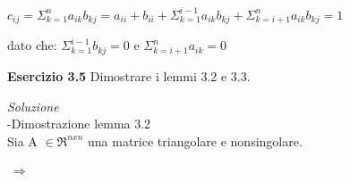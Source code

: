 \documentclass[20pt,a4paper]{book}
\begin{document}
\begin{math} c_{ij}=\Sigma_{k=1}^{n}a_{ik}b_{kj}=a_{ii}+b_{ii}+ \Sigma_{k=1}^{i-1}a_{ik}b_{kj}+ \Sigma_{k=i+1}^{n}a_{ik}b_{kj}=1 \end{math}

dato che: \begin{math} \Sigma_{k=1}^{i-1}b_{kj}=0\end{math} e   \begin{math}\Sigma_{k=i+1}^{n}a_{ik}=0\end{math}


\vspace{10mm}

\textbf{\Large{Esercizio 3.5}}  
Dimostrare i lemmi 3.2 e 3.3.

\textit{Soluzione}
\\-Dimostrazione lemma 3.2\\
Sia A \begin{math}\in\Re^{nxn}\end{math} una matrice triangolare e nonsingolare.\\
\\\begin{math}\ \Rightarrow \end{math}
\end{document}
